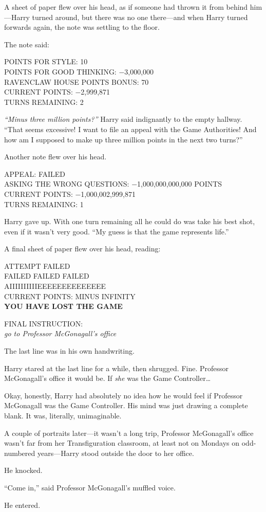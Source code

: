A sheet of paper flew over his head, as if someone had thrown it from
behind him---Harry turned around, but there was no one there---and when
Harry turned forwards again, the note was settling to the floor.

The note said:

POINTS FOR STYLE: 10\\POINTS FOR GOOD THINKING: −3,000,000\\RAVENCLAW
HOUSE POINTS BONUS: 70\\CURRENT POINTS: −2,999,871\\TURNS REMAINING: 2

\emph{``Minus three million points?''} Harry said indignantly to the
empty hallway. ``That seems excessive! I want to file an appeal with the
Game Authorities! And how am I supposed to make up three million points
in the next two turns?''

Another note flew over his head.

APPEAL: FAILED\\ASKING THE WRONG QUESTIONS: −1,000,000,000,000
POINTS\\CURRENT POINTS: −1,000,002,999,871\\TURNS REMAINING: 1

Harry gave up. With one turn remaining all he could do was take his best
shot, even if it wasn't very good. ``My guess is that the game
represents life.''

A final sheet of paper flew over his head, reading:

ATTEMPT FAILED\\FAILED FAILED FAILED\\AIIIIIIIIIIEEEEEEEEEEEEEE\\CURRENT
POINTS: MINUS INFINITY\\\textbf{YOU HAVE LOST THE GAME}

FINAL INSTRUCTION:\\\emph{go to Professor McGonagall's office}

The last line was in his own handwriting.

Harry stared at the last line for a while, then shrugged. Fine.
Professor McGonagall's office it would be. If \emph{she} was the Game
Controller\ldots{}

Okay, honestly, Harry had absolutely no idea how he would feel if
Professor McGonagall was the Game Controller. His mind was just drawing
a complete blank. It was, literally, unimaginable.

A couple of portraits later---it wasn't a long trip, Professor
McGonagall's office wasn't far from her Transfiguration classroom, at
least not on Mondays on odd-numbered years---Harry stood outside the
door to her office.

He knocked.

``Come in,'' said Professor McGonagall's muffled voice.

He entered.
